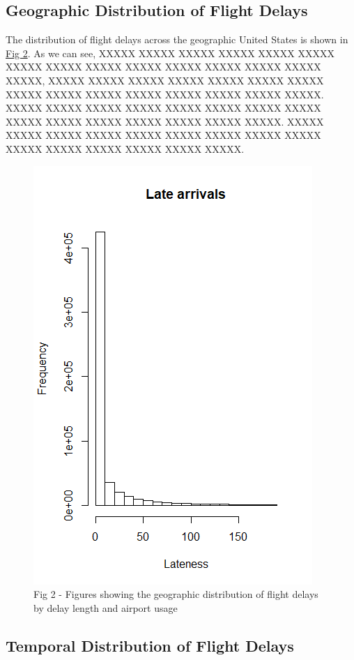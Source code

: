 \documentclass[12pt, a4paper]{book}
\newcommand\tab[1][1cm]{\hspace*{#1}}
\begin{document}
		\subsection{Geographic Distribution of Flight Delays}
		
			\tab The distribution of flight delays across the geographic United States is shown in \underline{Fig 2}. As we can see, XXXXX XXXXX XXXXX XXXXX XXXXX XXXXX XXXXX XXXXX XXXXX XXXXX XXXXX XXXXX XXXXX XXXXX XXXXX, XXXXX XXXXX XXXXX XXXXX XXXXX XXXXX XXXXX XXXXX XXXXX XXXXX XXXXX XXXXX XXXXX XXXXX XXXXX. XXXXX XXXXX XXXXX XXXXX XXXXX XXXXX XXXXX XXXXX XXXXX XXXXX XXXXX XXXXX XXXXX XXXXX XXXXX. XXXXX XXXXX XXXXX XXXXX XXXXX XXXXX XXXXX XXXXX XXXXX XXXXX XXXXX XXXXX XXXXX XXXXX XXXXX.\\
			\begin{figure}
			\centering
	 		\includegraphics[width = .45 \textwidth]{../figures/LateArrivalsHistogram}
	 		\caption{Fig 2 - Figures showing the geographic distribution of flight delays by delay length and airport usage}
	 		\end{figure}
	 		
		\subsection{Temporal Distribution of Flight Delays}
		
\end{document}

